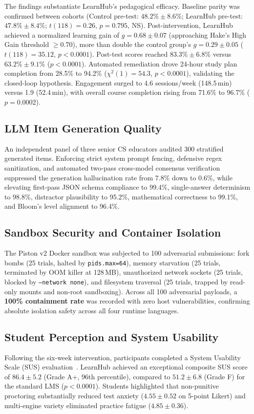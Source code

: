 \documentclass[journal]{IEEEtran}
\begin{document}
The findings substantiate LearnHub's pedagogical efficacy. Baseline parity was confirmed between cohorts (Control pre-test: $48.2\% \pm 8.6\%$; LearnHub pre-test: $47.8\% \pm 8.4\%$; $t(118) = 0.26$, $p = 0.795$, NS). Post-intervention, LearnHub achieved a normalized learning gain of $g = 0.68 \pm 0.07$ (approaching Hake's High Gain threshold $\ge 0.70$), more than double the control group's $g = 0.29 \pm 0.05$ ($t(118) = 35.12$, $p < 0.0001$). Post-test scores reached $83.3\% \pm 6.8\%$ versus $63.2\% \pm 9.1\%$ ($p < 0.0001$). Automated remediation drove 24-hour study plan completion from 28.5\% to 94.2\% ($\chi^2(1) = 54.3$, $p < 0.0001$), validating the closed-loop hypothesis. Engagement surged to 4.6 sessions/week (148.5\,min) versus 1.9 (52.4\,min), with overall course completion rising from 71.6\% to 96.7\% ($p = 0.0002$).

\subsection{LLM Item Generation Quality}
An independent panel of three senior CS educators audited 300 stratified generated items. Enforcing strict system prompt fencing, defensive regex sanitization, and automated two-pass cross-model consensus verification suppressed the generation hallucination rate from 7.8\% down to 0.6\%, while elevating first-pass JSON schema compliance to 99.4\%, single-answer determinism to 98.8\%, distractor plausibility to 95.2\%, mathematical correctness to 99.1\%, and Bloom's level alignment to 96.4\%.

\subsection{Sandbox Security and Container Isolation}
The Piston v2 Docker sandbox was subjected to 100 adversarial submissions: fork bombs (25 trials, halted by \texttt{pids.max=64}), memory starvation (25 trials, terminated by OOM killer at 128\,MB), unauthorized network sockets (25 trials, blocked by \texttt{--network none}), and filesystem traversal (25 trials, trapped by read-only mounts and non-root sandboxing). Across all 100 adversarial payloads, a \textbf{100\% containment rate} was recorded with zero host vulnerabilities, confirming absolute isolation safety across all four runtime languages.

\subsection{Student Perception and System Usability}
Following the six-week intervention, participants completed a System Usability Scale (SUS) evaluation~\cite{sailer2020}. LearnHub achieved an exceptional composite SUS score of $86.4 \pm 5.2$ (Grade A+, 96th percentile), compared to $51.2 \pm 6.8$ (Grade F) for the standard LMS ($p < 0.0001$). Students highlighted that non-punitive proctoring substantially reduced test anxiety ($4.55 \pm 0.52$ on 5-point Likert) and multi-engine variety eliminated practice fatigue ($4.85 \pm 0.36$).
\end{document}

